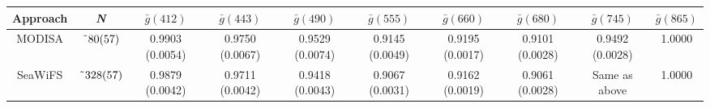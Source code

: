 \documentclass[preview]{standalone}
\begin{document}
\begin{threeparttable}

\centering
\begin{tabular}{cccccccccc} 
 \hline 
Approach & {\it N}\tnote{\it a}			  & $\bar{g}(412)$ 	 			& $\bar{g}(443)$ 	  			& $\bar{g}(490)$    			& $\bar{g}(555)$    			& $\bar{g}(660)$    						& $\bar{g}(680)$    						& $\bar{g}(745)$    			& $\bar{g}(865)$    \\ \hline
MODISA\tnote{\it b}& $\char`\~80(57)$ & 0.9903 (0.0054) & 0.9750 (0.0067) & 0.9529 (0.0074) & 0.9145 (0.0049) & 0.9195 (0.0017) & 0.9101 (0.0028) &  0.9492 (0.0028) 	& 1.0000 \\%
SeaWiFS\tnote{\it b}& $\char`\~328(57)$ &  0.9879 (0.0042) & 0.9711 (0.0042) & 0.9418 (0.0043) & 0.9067 (0.0031) & 0.9162 (0.0019)\tnote{\it c} & 0.9061 (0.0028)\tnote{\it c} & Same as above   & 1.0000 \\%

\end{tabular}
\end{threeparttable}
\end{document}
